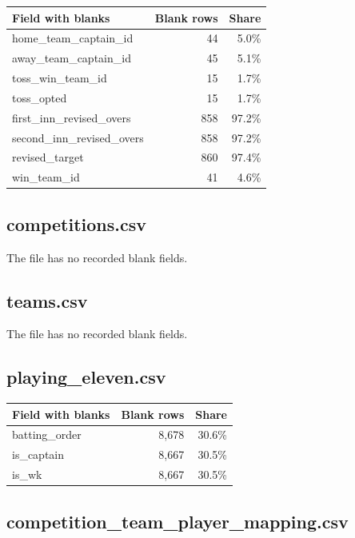 \begin{center}
\begin{tabularx}{\linewidth}{>{\raggedright\arraybackslash}Xrr}
\toprule
Field with blanks & Blank rows & Share \\
\midrule
home\_team\_captain\_id & 44 & 5.0\% \\
away\_team\_captain\_id & 45 & 5.1\% \\
toss\_win\_team\_id & 15 & 1.7\% \\
toss\_opted & 15 & 1.7\% \\
first\_inn\_revised\_overs & 858 & 97.2\% \\
second\_inn\_revised\_overs & 858 & 97.2\% \\
revised\_target & 860 & 97.4\% \\
win\_team\_id & 41 & 4.6\% \\
\bottomrule
\end{tabularx}
\end{center}

\subsection*{competitions.csv}

The file has no recorded blank fields.

\subsection*{teams.csv}

The file has no recorded blank fields.

\subsection*{playing\_eleven.csv}

\begin{center}
\begin{tabularx}{\linewidth}{>{\raggedright\arraybackslash}Xrr}
\toprule
Field with blanks & Blank rows & Share \\
\midrule
batting\_order & 8,678 & 30.6\% \\
is\_captain & 8,667 & 30.5\% \\
is\_wk & 8,667 & 30.5\% \\
\bottomrule
\end{tabularx}
\end{center}

\subsection*{competition\_team\_player\_mapping.csv}

